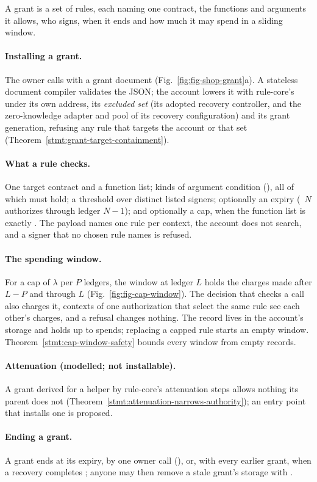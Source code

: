 A grant is a set of rules, each naming one contract, the functions and
arguments it allows, who signs, when it ends and how much it may spend in a
sliding window.


\paragraph{Installing a grant.} The owner calls  with a grant
document (Fig.~\ref{fig:fig-shop-grant}a). A stateless document compiler
validates the JSON; the account lowers it with rule-core's 
under its own address, its \emph{excluded set} (its adopted recovery
controller, and the zero-knowledge adapter and pool of its recovery
configuration) and its grant generation, refusing any rule that targets the
account or that set (Theorem~\ref{stmt:grant-target-containment}).

\paragraph{What a rule checks.} One target contract and a function list;
 kinds of argument condition (),
all of which must hold; a threshold over distinct listed signers; optionally an
expiry (~$N$ authorizes through ledger $N-1$); and
optionally a cap, when the function list is exactly \code{["transfer"]}. The
payload names one rule per context, the account does not search, and a signer
that no chosen rule names is refused.

\paragraph{The spending window.} For a cap of $\lambda$ per $P$ ledgers, the
window at ledger $L$ holds the charges made after $L-P$ and through $L$
(Fig.~\ref{fig:fig-cap-window}). The decision that checks a call also charges
it, contexts of one authorization that select the same rule see each other's
charges, and a refusal changes nothing. The record lives in the account's
storage and holds up to  spends; replacing a capped
rule starts an empty window. Theorem~\ref{stmt:cap-window-safety} bounds every
window from empty records.

\paragraph{Attenuation (modelled; not installable).} A grant derived for a helper
by rule-core's  attenuation steps allows nothing its
parent does not (Theorem~\ref{stmt:attenuation-narrows-authority}); an entry
point that installs one is proposed.

\paragraph{Ending a grant.} A grant ends at its expiry, by one owner call
(), or, with every earlier grant, when a recovery completes
; anyone may then remove a stale grant's storage
with .

